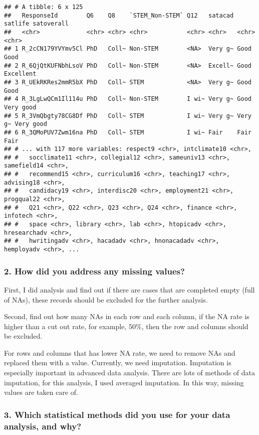 \documentclass[
]{article}
\begin{document}
\begin{verbatim}
## # A tibble: 6 x 125
##   ResponseId        Q6    Q8    `STEM_Non-STEM` Q12   satacad satlife satoverall
##   <chr>             <chr> <chr> <chr>           <chr> <chr>   <chr>   <chr>     
## 1 R_2cCN179YVYmv5Cl PhD   Coll~ Non-STEM        <NA>  Very g~ Good    Good      
## 2 R_6QjQtKUFNbhLsoV PhD   Coll~ Non-STEM        <NA>  Excell~ Good    Excellent 
## 3 R_UEkRKRes2mmR5bX PhD   Coll~ STEM            <NA>  Very g~ Good    Good      
## 4 R_3LgLwQCm1Il114u PhD   Coll~ Non-STEM        I wi~ Very g~ Good    Very good 
## 5 R_3VmQbgty78CG8Df PhD   Coll~ STEM            I wi~ Very g~ Very g~ Very good 
## 6 R_3QMoPUV7Zwm16na PhD   Coll~ STEM            I wi~ Fair    Fair    Fair      
## # ... with 117 more variables: respect9 <chr>, intclimate10 <chr>,
## #   socclimate11 <chr>, collegial12 <chr>, sameuniv13 <chr>, samefield14 <chr>,
## #   recommend15 <chr>, curriculum16 <chr>, teaching17 <chr>, advising18 <chr>,
## #   candidacy19 <chr>, interdisc20 <chr>, employment21 <chr>, progqual22 <chr>,
## #   Q21 <chr>, Q22 <chr>, Q23 <chr>, Q24 <chr>, finance <chr>, infotech <chr>,
## #   space <chr>, library <chr>, lab <chr>, htopicadv <chr>, hresearchadv <chr>,
## #   hwritingadv <chr>, hacadadv <chr>, hnonacadadv <chr>, hemployadv <chr>, ...
\end{verbatim}

\hypertarget{how-did-you-address-any-missing-values}{%
\subsubsection{2. How did you address any missing
values?}\label{how-did-you-address-any-missing-values}}

First, I did analysis and find out if there are cases that are completed
empty (full of NAs), these records should be excluded for the further
analysis.

Second, find out how many NAs in each row and each column, if the NA
rate is higher than a cut out rate, for example, 50\%, then the row and
columns should be excluded.

For rows and columns that has lower NA rate, we need to remove NAs and
replaced them with a value. Currently, we need imputation. Imputation is
especially important in advanced data analysis. There are lots of
methods of data imputation, for this analysis, I used averaged
imputation. In this way, missing values are taken care of.

\hypertarget{which-statistical-methods-did-you-use-for-your-data-analysis-and-why}{%
\subsubsection{3. Which statistical methods did you use for your data
analysis, and
why?}\label{which-statistical-methods-did-you-use-for-your-data-analysis-and-why}}
\end{document}
